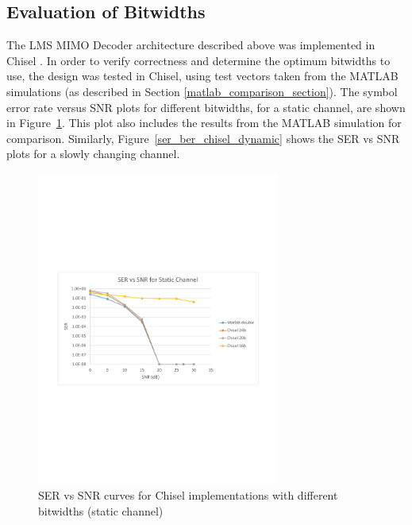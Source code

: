 \documentclass[journal]{IEEEtran}
\begin{document}
\subsection{Evaluation of Bitwidths}

The LMS MIMO Decoder architecture described above was implemented in Chisel \cite{chisel}. In order to verify correctness and determine the optimum bitwidths to use, the design was tested in Chisel, using test vectors taken from the MATLAB simulations (as described in Section \ref{matlab_comparison_section}). The symbol error rate versus SNR plots for different bitwidths, for a static channel, are shown in Figure~\ref{ser_ber_chisel_static}. This plot also includes the results from the MATLAB simulation for comparison. Similarly, Figure~\ref{ser_ber_chisel_dynamic} shows the SER vs SNR plots for a slowly changing channel.

\begin{figure}[!h]
\centering
\includegraphics*[width=8cm, viewport = 80 260 560 530]{images/snr_ber_curves_chisel_static.pdf}
\caption{SER vs SNR curves for Chisel implementations with different bitwidths (static channel)}
\label{ser_ber_chisel_static}
\end{figure}
\end{document}
